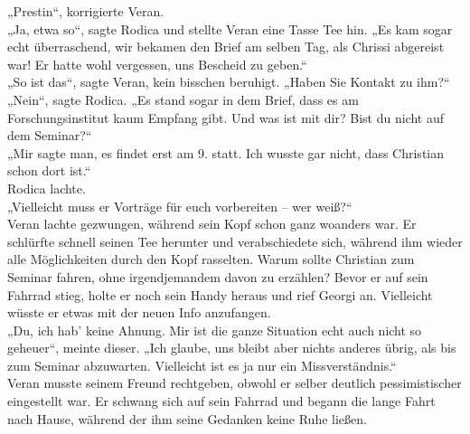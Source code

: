 \documentclass[oneside]{memoir}
\begin{document}
„Prestin“, korrigierte Veran. \\
„Ja, etwa so“, sagte Rodica und stellte Veran eine Tasse Tee hin. „Es kam sogar echt überraschend, wir bekamen den Brief am selben Tag, als Chrissi abgereist war! Er hatte wohl vergessen, uns Bescheid zu geben.“ \\
„So ist das“, sagte Veran, kein bisschen beruhigt. „Haben Sie Kontakt zu ihm?“ \\
„Nein“, sagte Rodica. „Es stand sogar in dem Brief, dass es am Forschungsinstitut kaum Empfang gibt. Und was ist mit dir? Bist du nicht auf dem Seminar?“ \\
„Mir sagte man, es findet erst am 9. statt. Ich wusste gar nicht, dass Christian schon dort ist.“ \\
Rodica lachte. \\
„Vielleicht muss er Vorträge für euch vorbereiten – wer weiß?“ \\
Veran lachte gezwungen, während sein Kopf schon ganz woanders war. Er schlürfte schnell seinen Tee herunter und verabschiedete sich, während ihm wieder alle Möglichkeiten durch den Kopf rasselten. Warum sollte Christian zum Seminar fahren, ohne irgendjemandem davon zu erzählen? Bevor er auf sein Fahrrad stieg, holte er noch sein Handy heraus und rief Georgi an. Vielleicht wüsste er etwas mit der neuen Info anzufangen. \\
„Du, ich hab' keine Ahnung. Mir ist die ganze Situation echt auch nicht so geheuer“, meinte dieser. „Ich glaube, uns bleibt aber nichts anderes übrig, als bis zum Seminar abzuwarten. Vielleicht ist es ja nur ein Missverständnis.“ \\
Veran musste seinem Freund rechtgeben, obwohl er selber deutlich pessimistischer eingestellt war. Er schwang sich auf sein Fahrrad und begann die lange Fahrt nach Hause, während der ihm seine Gedanken keine Ruhe ließen.
\end{document}
